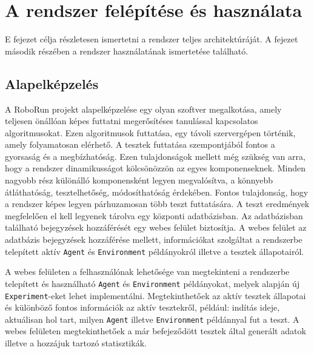 \chapter{A rendszer felépítése és használata}\label{ch:Felepites}

\begin{osszefoglal}
	E fejezet célja részletesen ismertetni a rendszer teljes architektúráját. A fejezet második részében a rendszer használatának ismertetése található. 
\end{osszefoglal}


\section{Alapelképzelés}\label{sec:Alapelkepzels}

A RoboRun projekt alapelképzelése egy olyan szoftver megalkotása, amely teljesen önállóan képes futtatni megerősítéses tanulással kapcsolatos algoritmusokat. Ezen algoritmusok futtatása, egy távoli szervergépen történik, amely folyamatosan elérhető. A tesztek futtatása szempontjából fontos a gyorsaság és a megbízhatóság. Ezen tulajdonságok mellett még szükség van arra, hogy a rendszer dinamikusságot kölcsönözzön az egyes komponenseknek. Minden nagyobb rész különálló komponensként legyen megvalósítva, a könnyebb átláthatóság, tesztelhetőség, módosíthatóság érdekében. Fontos tulajdonság, hogy a rendszer képes legyen párhuzamosan több teszt futtatására. A teszt eredmények megfelelően el kell legyenek tárolva egy központi adatbázisban. Az adatbázisban található bejegyzések hozzáférését egy webes felület biztosítja. A webes felület az adatbázis bejegyzések hozzáférése mellett, információkat szolgáltat a rendszerbe telepített aktív \texttt{Agent} és \texttt{Environment} példányokról illetve a tesztek állapotairól.

A webes felületen a felhasználónak lehetősége van megtekinteni a rendszerbe telepített és használható \texttt{Agent} és \texttt{Environment} példányokat, melyek alapján új \texttt{Experiment}-eket lehet implementálni. Megtekinthetőek az aktív tesztek állapotai és különböző fontos információk az aktív tesztekről, például: indítás ideje, aktuálisan hol tart, milyen \texttt{Agent} illetve \texttt{Environment} példánnyal fut a teszt. A webes felületen megtekinthetőek a már befejeződött tesztek által generált adatok illetve a hozzájuk tartozó statisztikák. 


